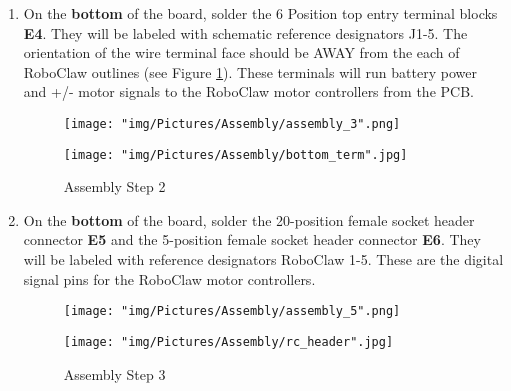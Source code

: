 \documentclass[12pt]{article}
\begin{document}
\begin{enumerate}
\item On the \textbf{bottom} of the board, solder the 6 Position top entry terminal blocks \textbf{E4}. They will be labeled with schematic reference designators J1-5. The orientation of the wire terminal face should be AWAY from the each of RoboClaw outlines (see Figure \ref{assem_2}). These terminals will run battery power and +/- motor signals to the RoboClaw motor controllers from the PCB.

\begin{figure}[H]
  \centering
  \begin{minipage}[b]{0.45\textwidth}
    \texttt{[image: "img/Pictures/Assembly/assembly\_3".png]}
  \end{minipage}
  \hfill
  \begin{minipage}[b]{0.45\textwidth}
    \texttt{[image: "img/Pictures/Assembly/bottom\_term".jpg]}
  \end{minipage}
  \caption{Assembly Step 2}
  \label{assem_2}
\end{figure}

\item On the \textbf{bottom} of the board, solder the 20-position female socket header connector \textbf{E5} and the 5-position female socket header connector \textbf{E6}. They will be labeled with reference designators RoboClaw 1-5. These are the digital signal pins for the RoboClaw motor controllers.

\begin{figure}[H]
  \centering
  \begin{minipage}[b]{0.45\textwidth}
    \texttt{[image: "img/Pictures/Assembly/assembly\_5".png]}
  \end{minipage}
  \hfill
  \begin{minipage}[b]{0.45\textwidth}
    \texttt{[image: "img/Pictures/Assembly/rc\_header".jpg]}
  \end{minipage}
  \caption{Assembly Step 3}
  \label{assem_3}
\end{figure}

\end{enumerate}
\end{document}
